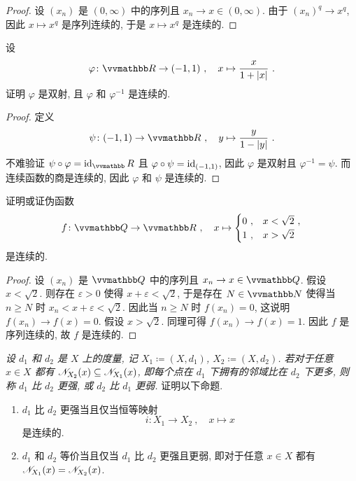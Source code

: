 \begin{proof}
    设 \((x_n)\) 是 \((0, \infty)\) 中的序列且 \(x_n \to x \in (0, \infty)\). 由于 \((x_n)^q \to x^q\), 因此 \(x \mapsto x^q\) 是序列连续的, 于是 \(x \mapsto x^q\) 是连续的.
\end{proof}

\begin{exercise}
    设
    \[
        \varphi \colon \R \to (- 1, 1)\ ,\quad x \mapsto \frac{x}{1 + |x|}\ .
    \]
    证明 \(\varphi\) 是双射, 且 \(\varphi\) 和 \(\varphi^{- 1}\) 是连续的.
\end{exercise}

\begin{proof}
    定义
    \[
        \psi \colon (- 1, 1) \to \R\ ,\quad y \mapsto \frac{y}{1 - |y|}\ .
    \]
    不难验证 \(\psi \circ \varphi = \id_\R\) 且 \(\varphi \circ \psi = \operatorname{id}_{(- 1, 1)}\), 因此 \(\varphi\) 是双射且 \(\varphi^{- 1} = \psi\). 而连续函数的商是连续的, 因此 \(\varphi\) 和 \(\psi\) 是连续的.
\end{proof}

\begin{exercise}
    证明或证伪函数
    \[
        f \colon \Q \to \R\ ,\quad x \mapsto
        \begin{cases}
            0\ , & x < \sqrt{2}\ , \\
            1\ , & x > \sqrt{2}
        \end{cases}
    \]
    是连续的.
\end{exercise}

\begin{proof}
    设 \((x_n)\) 是 \(\Q\) 中的序列且 \(x_n \to x \in \Q\). 假设 \(x < \sqrt{2}\). 则存在 \(\varepsilon > 0\) 使得 \(x + \varepsilon < \sqrt{2}\), 于是存在 \(N \in \N\) 使得当 \(n \geq N\) 时 \(x_n < x+ \varepsilon < \sqrt{2}\). 因此当 \(n \geq N\) 时 \(f(x_n) = 0\), 这说明 \(f(x_n) \to f(x) = 0\). 假设 \(x > \sqrt{2}\). 同理可得 \(f(x_n) \to f(x) = 1\). 因此 \(f\) 是序列连续的, 故 \(f\) 是连续的.
\end{proof}

\begin{exercise}
    \textsl{设 \(d_1\) 和 \(d_2\) 是 \(X\) 上的度量, 记 \(X_1 \coloneqq (X, d_1)\), \(X_2 \coloneqq (X, d_2)\). 若对于任意 \(x \in X\) 都有 \(\mathscr N_{X_2}(x) \subseteq \mathscr N_{X_1}(x)\), 即每个点在 \(d_1\) 下拥有的邻域比在 \(d_2\) 下更多, 则称 \(d_1\) 比 \(d_2\) 更强, 或 \(d_2\) 比 \(d_1\) 更弱.} 证明以下命题.
    \begin{enumerate}
        \item \(d_1\) 比 \(d_2\) 更强当且仅当恒等映射
        \[
            i \colon X_1 \to X_2\ ,\quad x \mapsto x
        \]
        是连续的.
        \item \(d_1\) 和 \(d_2\) 等价当且仅当 \(d_1\) 比 \(d_2\) 更强且更弱, 即对于任意 \(x \in X\) 都有 \(\mathscr N_{X_1}(x) = \mathscr N_{X_2}(x)\).
    \end{enumerate}
\end{exercise}

